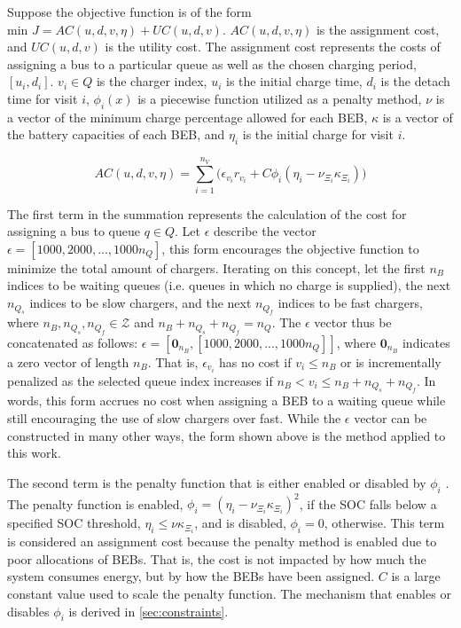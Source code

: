 \documentclass[11pt,a4paper,final]{article}
\newcommand{\AC}{AC(u, d, v, \eta)}         %
\newcommand{\UC}{UC(u, d, v)}               %
\newcommand{\Qset}{Q}                       %
\begin{document}
Suppose the objective function is of the form \(\text{min } J = \AC + \UC\). \(\AC\) is the assignment cost, and \(\UC\) is
the utility cost. The assignment cost represents the costs of assigning a bus to a particular queue as well as the
chosen charging period, \([u_i, d_i]\). \(v_i \in \Qset\) is the charger index, \(u_i\) is the initial charge time, \(d_i\) is the
detach time for visit \(i\), \(\phi_i(x)\) is a piecewise function utilized as a penalty method, \(\nu\) is a vector of the minimum
charge percentage allowed for each BEB, \(\kappa\) is a vector of the battery capacities of each BEB, and \(\eta_i\) is the initial
charge for visit \(i\).

\begin{equation}
\label{eq:ac}
\AC = \sum_{i=1}^{n_V} \Big(\epsilon_{v_i}r_{v_i} + C \phi_i(\eta_i - \nu_{\Xi_i} \kappa_{\Xi_i}) \Big)
\end{equation}

The first term in the summation represents the calculation of the cost for assigning a bus to queue \(q \in Q\). Let \(\epsilon\)
describe the vector \(\epsilon = [1000, 2000, ..., 1000n_Q]\), this form encourages the objective function to minimize the total
amount of chargers. Iterating on this concept, let the first \(n_B\) indices to be waiting queues (i.e. queues in which no
charge is supplied), the next \(n_{Q_s}\) indices to be slow chargers, and the next \(n_{Q_f}\) indices to be fast chargers,
where \(n_B, n_{Q_s}, n_{Q_f} \in \mathcal{Z}\) and \(n_B + n_{Q_s} + n_{Q_f} = n_Q\). The \(\epsilon\) vector thus be concatenated as follows:
\(\epsilon = [\mathbf{0}_{n_B}, [1000, 2000, ..., 1000n_Q]]\), where \(\mathbf{0}_{n_B}\) indicates a zero vector of length \(n_B\).
That is, \(\epsilon_{v_i}\) has no cost if \(v_i \le n_B\) or is incrementally penalized as the selected queue index increases if
\(n_B < v_i \le n_B + n_{Q_s} + n_{Q_f}\). In words, this form accrues no cost when assigning a BEB to a waiting queue while
still encouraging the use of slow chargers over fast. While the \(\epsilon\) vector can be constructed in many other ways, the
form shown above is the method applied to this work.

The second term is the penalty function that is either enabled or disabled by \(\phi_i\)
\cite{luenberger-2008-penal-barrier-method}. The penalty function is enabled, \(\phi_i = (\eta_i - \nu_{\Xi_i} \kappa_{\Xi_i})^2\), if the
SOC falls below a specified SOC threshold, \(\eta_i \le \nu \kappa_{\Xi_i}\), and is disabled, \(\phi_i = 0\), otherwise. This term is
considered an assignment cost because the penalty method is enabled due to poor allocations of BEBs. That is, the cost
is not impacted by how much the system consumes energy, but by how the BEBs have been assigned. \(C\) is a large constant
value used to scale the penalty function. The mechanism that enables or disables \(\phi_i\) is derived in \ref{sec:constraints}.
\end{document}
